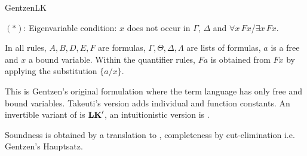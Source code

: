 \begin{entry}{GentzenLK}
\begin{calculus}
$(*)$: Eigenvariable condition: $x$ does not occur in $\Gamma$, $\Delta$ and $\forall x\, F x$/$\exists x\, F x$.

\end{calculus}


 \begin{clarifications}
   In all rules, $A,B,D,E,F$ are formulas, $\Gamma,\Theta,\Delta,\Lambda$ are lists of formulas, $a$ is a free and $x$ a bound variable. Within the quantifier rules, $F a$ is obtained from $F x$ by applying the substitution $\{ a/x \} $.

 \end{clarifications}

 \begin{history}
This is Gentzen's original formulation\cite{lk:Gentzen1935} where the term language has only free and bound variables. Takeuti's version\cite{lk:Takeuti1975} adds individual and function constants. An invertible variant of \LK is $\mathbf{LK}'$, an intuitionistic version is \LJ{}. 
\end{history}

\begin{technicalities}
Soundness is obtained by a translation to \ND{}, completeness by cut-elimination i.e. Gentzen's Hauptsatz\cite{lk:Gentzen1935}.
\end{technicalities}
\end{entry}
\let\LKAX\undefined
\let\LKUI\undefined
\let\LKBI\undefined
\let\LKLL\undefined
\let\LKRL\undefined
\let\LKRLN\undefined

\let\SALLL  \undefined
\let\SALLR  \undefined
\let\SEXL   \undefined
\let\SEXR   \undefined
\let\SANDL  \undefined
\let\SANDR  \undefined
\let\SORL   \undefined
\let\SORR   \undefined
\let\SIMPL  \undefined
\let\SIMPR  \undefined
\let\SNEGL  \undefined
\let\SNEGR  \undefined
\let\SWEAKL \undefined
\let\SWEAKR \undefined
\let\SCONTRL\undefined
\let\SCONTRR\undefined
\let\SEXCHL \undefined
\let\SEXCHR \undefined
\let\SCUT   \undefined
\let\SDEF   \undefined

\let\ALLL  \undefined
\let\ALLR  \undefined
\let\EXL   \undefined
\let\EXR   \undefined
\let\ANDL  \undefined
\let\ANDR  \undefined
\let\ORL   \undefined
\let\ORR   \undefined
\let\IMPL  \undefined
\let\IMPR  \undefined
\let\NEGL  \undefined
\let\NEGR  \undefined
\let\WEAKL \undefined
\let\WEAKR \undefined
\let\CONTRL\undefined
\let\CONTRR\undefined
\let\EXCHL \undefined
\let\EXCHR \undefined
\let\CUT   \undefined
\let\DEF   \undefined